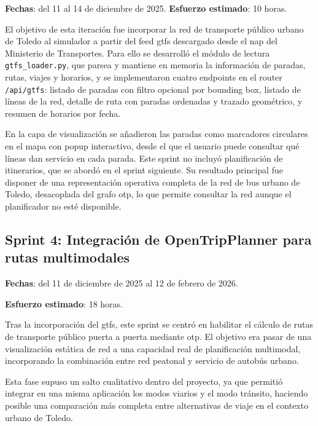 \textbf{Fechas}: del 11 al 14 de diciembre de 2025.
\textbf{Esfuerzo estimado}: 10 horas.\newline

El objetivo de esta iteración fue incorporar la red de transporte público urbano de Toledo al simulador a partir del feed \gls{gtfs} descargado desde el \gls{nap} del Ministerio de Transportes. Para ello se desarrolló el módulo de lectura \texttt{gtfs\_loader.py}, que parsea y mantiene en memoria la información de paradas, rutas, viajes y horarios, y se implementaron cuatro endpoints en el router \texttt{/api/gtfs}: listado de paradas con filtro opcional por bounding box, listado de líneas de la red, detalle de ruta con paradas ordenadas y trazado geométrico, y resumen de horarios por fecha.\newline

En la capa de visualización se añadieron las paradas como marcadores circulares en el mapa con popup interactivo, desde el que el usuario puede consultar qué líneas dan servicio en cada parada. Este sprint no incluyó planificación de itinerarios, que se abordó en el sprint siguiente. Su resultado principal fue disponer de una representación operativa completa de la red de bus urbano de Toledo, desacoplada del grafo \gls{otp}, lo que permite consultar la red aunque el planificador no esté disponible.\newline


\subsection{Sprint 4: Integración de OpenTripPlanner para rutas multimodales}

\textbf{Fechas}: del 11 de diciembre de 2025 al 12 de febrero de 2026.

\textbf{Esfuerzo estimado}: 18 horas.\newline

Tras la incorporación del \gls{gtfs}, este sprint se centró en habilitar el cálculo de rutas de transporte público puerta a puerta mediante \gls{otp}. El objetivo era pasar de una visualización estática de red a una capacidad real de planificación multimodal, incorporando la combinación entre red peatonal y servicio de autobús urbano.\newline

Esta fase supuso un salto cualitativo dentro del proyecto, ya que permitió integrar en una misma aplicación los modos viarios y el modo tránsito, haciendo posible una comparación más completa entre alternativas de viaje en el contexto urbano de Toledo.
\newpage
